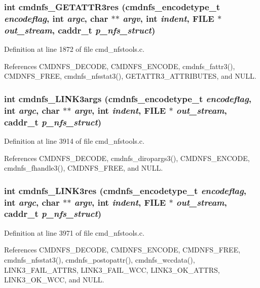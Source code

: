 \subsubsection{\setlength{\rightskip}{0pt plus 5cm}int cmdnfs\_\-GETATTR3res ({\bf cmdnfs\_\-encodetype\_\-t} {\em encodeflag}, int {\em argc}, char $\ast$$\ast$ {\em argv}, int {\em indent}, FILE $\ast$ {\em out\_\-stream}, caddr\_\-t {\em p\_\-nfs\_\-struct})}\label{cmd__nfstools_8h_a37}




Definition at line 1872 of file cmd\_\-nfstools.c.

References CMDNFS\_\-DECODE, CMDNFS\_\-ENCODE, cmdnfs\_\-fattr3(), CMDNFS\_\-FREE, cmdnfs\_\-nfsstat3(), GETATTR3\_\-ATTRIBUTES, and NULL.
\subsubsection{\setlength{\rightskip}{0pt plus 5cm}int cmdnfs\_\-LINK3args ({\bf cmdnfs\_\-encodetype\_\-t} {\em encodeflag}, int {\em argc}, char $\ast$$\ast$ {\em argv}, int {\em indent}, FILE $\ast$ {\em out\_\-stream}, caddr\_\-t {\em p\_\-nfs\_\-struct})}\label{cmd__nfstools_8h_a60}




Definition at line 3914 of file cmd\_\-nfstools.c.

References CMDNFS\_\-DECODE, cmdnfs\_\-diropargs3(), CMDNFS\_\-ENCODE, cmdnfs\_\-fhandle3(), CMDNFS\_\-FREE, and NULL.
\subsubsection{\setlength{\rightskip}{0pt plus 5cm}int cmdnfs\_\-LINK3res ({\bf cmdnfs\_\-encodetype\_\-t} {\em encodeflag}, int {\em argc}, char $\ast$$\ast$ {\em argv}, int {\em indent}, FILE $\ast$ {\em out\_\-stream}, caddr\_\-t {\em p\_\-nfs\_\-struct})}\label{cmd__nfstools_8h_a61}




Definition at line 3971 of file cmd\_\-nfstools.c.

References CMDNFS\_\-DECODE, CMDNFS\_\-ENCODE, CMDNFS\_\-FREE, cmdnfs\_\-nfsstat3(), cmdnfs\_\-postopattr(), cmdnfs\_\-wccdata(), LINK3\_\-FAIL\_\-ATTRS, LINK3\_\-FAIL\_\-WCC, LINK3\_\-OK\_\-ATTRS, LINK3\_\-OK\_\-WCC, and NULL.
